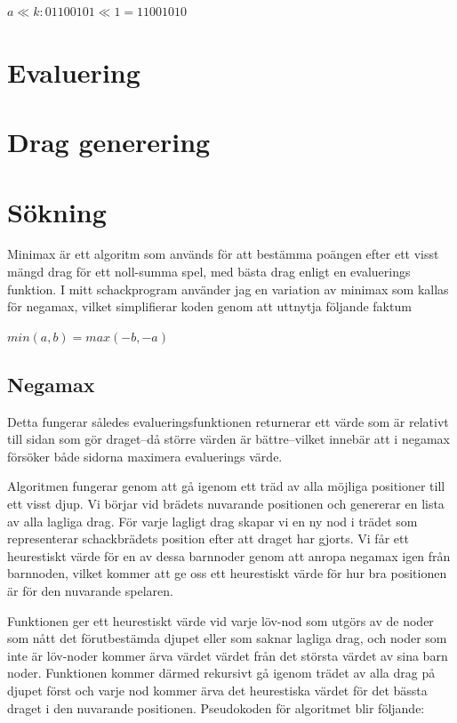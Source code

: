 \message{ !name(main.tex)}\documentclass{article}
\begin{document}
\begin{math}
a \ll k: 01100101 \ll 1 = 11001010
\end{math}

\section{Evaluering}
\section{Drag generering}


\section{Sökning}
Minimax är ett algoritm som används för att bestämma poängen efter ett visst mängd drag för ett noll-summa spel, med bästa drag enligt en evaluerings funktion. I mitt schackprogram använder jag en variation av minimax som kallas för negamax, vilket simplifierar koden genom att uttnytja följande faktum

\begin{math}
min(a,b)=max(-b,-a)
\end{math}

\subsection{Negamax}
Detta fungerar således evalueringsfunktionen returnerar ett värde som är relativt till sidan som gör draget--då större värden är bättre--vilket innebär att i negamax försöker både sidorna maximera evaluerings värde.

Algoritmen fungerar genom att gå igenom ett träd av alla möjliga positioner till ett visst djup. Vi börjar vid brädets nuvarande positionen och genererar en lista av alla lagliga drag. För varje lagligt drag skapar vi en ny nod i trädet som representerar schackbrädets position efter att draget har gjorts. Vi får ett heurestiskt värde för en av dessa barnnoder genom att anropa negamax igen från barnnoden, vilket kommer att ge oss ett heurestiskt värde för hur bra positionen är för den nuvarande spelaren.

Funktionen ger ett heurestiskt värde vid varje löv-nod som utgörs av de noder som nått det förutbestämda djupet eller som saknar lagliga drag, och noder som inte är löv-noder kommer ärva värdet värdet från det största värdet av sina barn noder. Funktionen kommer därmed rekursivt gå igenom trädet av alla drag på djupet först och varje nod kommer ärva det heurestiska värdet för det bässta draget i den nuvarande positionen.
Pseudokoden för algoritmet blir följande:
\end{document}
